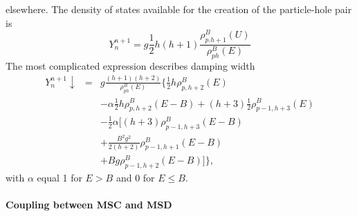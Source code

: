 elsewhere. The density of states available for the creation of the
particle-hole pair is
\begin{equation}
Y_{n}^{n+1}=g\frac{1}{2}h(h+1)\frac{\rho_{p.h+1}^{B}(U)}{\rho_{ph}^{B}(E)}
\label{Yplus}
\end{equation}
The most complicated expression describes damping width
\begin{eqnarray}
Y_{n}^{n+1}\downarrow & = & g\frac{(h+1)(h+2)}{\rho_{ph}^{B}(E)}\biggl\{%
\frac{1}{2}h\rho_{p,h+2}^{B}(E)  \nonumber \\
&&-\alpha\frac{1}{2}h\rho_{p,h+2}^{B}(E-B)+(h+3)\frac{1}{2}%
\rho_{p-1,h+3}^{B}(E)  \nonumber \\
& & -\frac{1}{2}\alpha\biggl[(h+3)\rho_{p-1,h+3}^{B}(E-B)  \nonumber
\label{Ydown} \\
& & +\frac{B^{2}g^{2}}{2(h+2)}\rho_{p-1,h+1}^{B}(E-B)  \nonumber \\
&& +Bg\rho_{p-1,h+2}^{B}(E-B)\biggr]\biggr\},
\end{eqnarray}
\noindent with $\alpha$ equal 1 for $E>B$ and 0 for $E\leq B$.

\paragraph{Coupling between MSC%
 and MSD%
}

